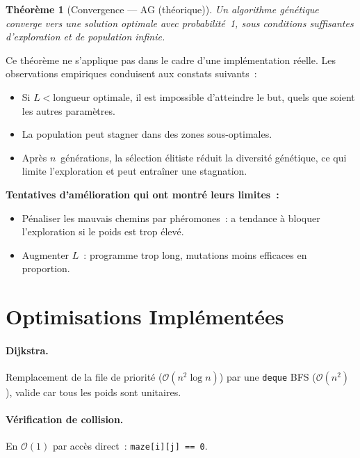 \documentclass[12pt, a4paper]{article}
\newtheorem{theorem}{Théorème}[section]
\theoremstyle{definition}
\theoremstyle{remark}
\newcommand{\bigO}[1]{\mathcal{O}\!\left(#1\right)}
\newcommand{\code}[1]{\texttt{#1}}
\begin{document}
\begin{theorem}[Convergence — AG (théorique)]
Un algorithme génétique converge vers une solution optimale avec probabilité~1,
sous conditions suffisantes d'exploration et de population infinie.
\end{theorem}

Ce théorème ne s'applique pas dans le cadre d'une implémentation réelle.
Les observations empiriques conduisent aux constats suivants~:

\begin{itemize}
    \item Si $L < \text{longueur optimale}$, il est impossible d'atteindre le but,
          quels que soient les autres paramètres.
    \item La population peut stagner dans des zones sous-optimales.
    \item Après $n$~générations, la sélection élitiste réduit la diversité
          génétique, ce qui limite l'exploration et peut entraîner une stagnation.
\end{itemize}

\textbf{Tentatives d'amélioration qui ont montré leurs limites~:}
\begin{itemize}[noitemsep]
    \item Pénaliser les mauvais chemins par phéromones~: a tendance à bloquer
          l'exploration si le poids est trop élevé.
    \item Augmenter $L$~: programme trop long, mutations moins efficaces en proportion.
\end{itemize}

\section{Optimisations Implémentées}

\paragraph{Dijkstra.}
Remplacement de la file de priorité ($\bigO{n^2 \log n}$) par une \code{deque}
BFS ($\bigO{n^2}$), valide car tous les poids sont unitaires.

\paragraph{Vérification de collision.}
En $\bigO{1}$ par accès direct~: \code{maze[i][j] == 0}.
\end{document}
